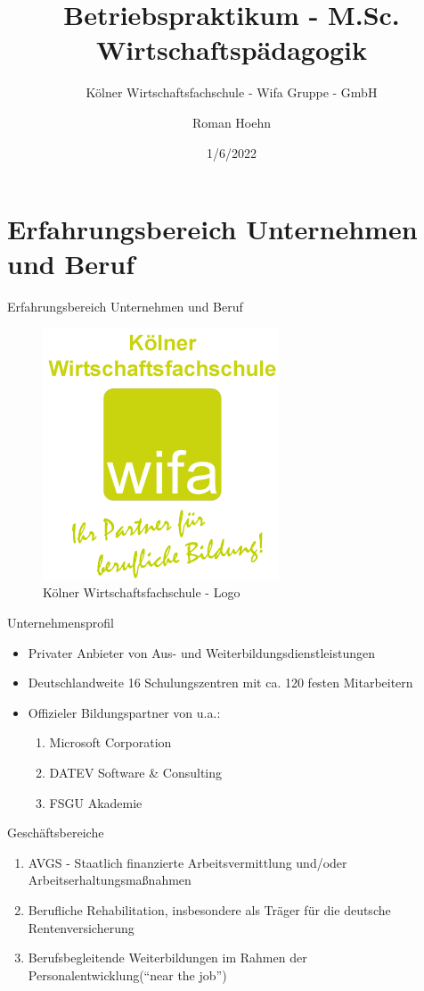 \documentclass[
  10pt,
  ignorenonframetext,
]{beamer}
\title{Betriebspraktikum - M.Sc. Wirtschaftspädagogik}
\subtitle{Kölner Wirtschaftsfachschule - Wifa Gruppe - GmbH}
\author{Roman Hoehn}
\date{1/6/2022}
\providecommand{\tightlist}{%
  \setlength{\itemsep}{0pt}\setlength{\parskip}{0pt}}
\begin{document}
\frame{\titlepage}

\hypertarget{erfahrungsbereich-unternehmen-und-beruf}{%
\section{Erfahrungsbereich Unternehmen und
Beruf}\label{erfahrungsbereich-unternehmen-und-beruf}}

\begin{frame}{Erfahrungsbereich Unternehmen und Beruf}
\begin{figure}
\centering
\includegraphics{pics/wifa_logo.png}
\caption{Kölner Wirtschaftsfachschule - Logo}
\end{figure}
\end{frame}

\begin{frame}{Unternehmensprofil}
\protect\hypertarget{unternehmensprofil}{}
\begin{itemize}
\tightlist
\item
  Privater Anbieter von Aus- und Weiterbildungsdienstleistungen
\item
  Deutschlandweite 16 Schulungszentren mit ca. 120 festen Mitarbeitern
\item
  Offizieler Bildungspartner von u.a.:

  \begin{enumerate}
  \tightlist
  \item
    Microsoft Corporation
  \item
    DATEV Software \& Consulting
  \item
    FSGU Akademie
  \end{enumerate}
\end{itemize}
\end{frame}

\begin{frame}{Geschäftsbereiche}
\protect\hypertarget{geschuxe4ftsbereiche}{}
\begin{enumerate}
\tightlist
\item
  AVGS - Staatlich finanzierte Arbeitsvermittlung und/oder
  Arbeitserhaltungsmaßnahmen
\item
  Berufliche Rehabilitation, insbesondere als Träger für die deutsche
  Rentenversicherung
\item
  Berufsbegleitende Weiterbildungen im Rahmen der
  Personalentwicklung(``near the job'')
\end{enumerate}
\end{frame}
\end{document}

